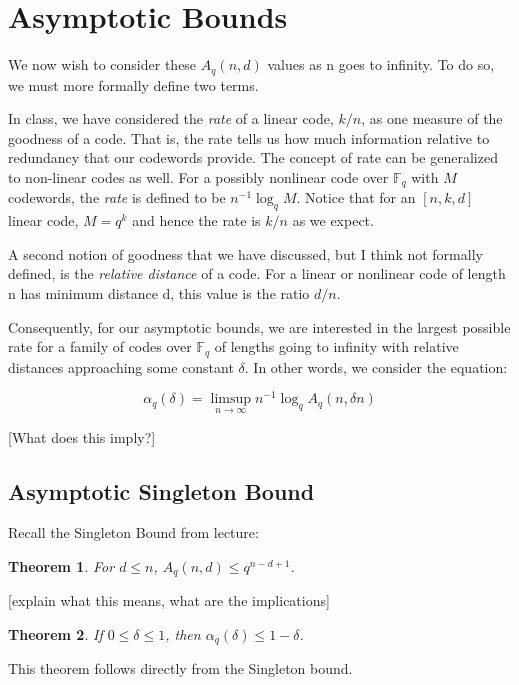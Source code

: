 \documentclass{article}
\newtheorem{theorem}{Theorem}
\theoremstyle{definition}
\numberwithin{exmp}{subsection}
\begin{document}
\section{Asymptotic Bounds}
We now wish to consider these $A_q(n,d)$ values as n goes to infinity.  To do so, we must more formally define two terms.

In class, we have considered the \textit{rate} of a linear code, $k/n$, as one measure of the goodness of a code.  That is,
the rate tells us how much information relative to redundancy that our codewords provide.  The concept of rate can be generalized
to non-linear codes as well.  For a possibly nonlinear code over $\mathbb{F}_q$ with $M$ codewords, the \textit{rate} is defined to be $n^{-1} \log_q {M}$.  Notice that
for an $[n,k,d]$ linear code, $M = q^k$ and hence the rate is $k/n$ as we expect.

A second notion of goodness that we have discussed, but I think not formally defined, is the \textit{relative distance} of a code.  For a linear or nonlinear code of length n
has minimum distance d, this value is the ratio $d/n$. 

Consequently, for our asymptotic bounds, we are interested in the largest possible rate for a family of codes over $\mathbb{F}_q$ of lengths going to infinity with relative 
distances approaching some constant $\delta$.  In other words, we consider the equation:

\begin{equation}
\alpha_{q}(\delta) = \limsup_{n \to \infty} n^{-1} \log_q A_q(n,\delta n)
\end{equation}


[What does this imply?]

\subsection{Asymptotic Singleton Bound}

Recall the Singleton Bound from lecture:

\begin{theorem}
For $d \le n$, $A_q(n,d) \le q^{n-d+1}$.
\end{theorem}

[explain what this means, what are the implications]


\begin{theorem}
If $0 \le \delta \le 1$, then $\alpha_q(\delta) \le 1 - \delta$.
\end{theorem} 
This theorem follows directly from the Singleton bound.
\end{document}
